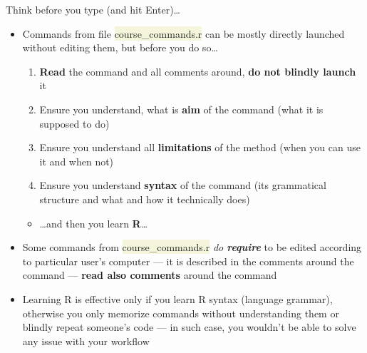 \documentclass[compress, ucs, xelatex, 11pt, xcolor=svgnames, aspectratio=169,
	hyperref={
		bookmarks=true,
		unicode=true,
		colorlinks=true,
		pdftitle={Molecular data in R},
		plainpages=false,
		pdfauthor={Vojtech Zeisek},
		pdfsubject={Course about phylogeny and evolution in R},
		pdfcreator={XeLaTeX},
		pdfkeywords={R, evolution, phylogeny, molecular data},
		linkcolor=Crimson, %
		anchorcolor=Magenta, %
		citecolor=Magenta, %
		filecolor=Magenta, %
		menucolor=Magenta, %
		urlcolor=DodgerBlue, %
		pdftex},
	url={hyphens, lowtilde} %
	]{beamer}
\renewcommand{\texttt}[1]{\colorbox{Beige}{{\ttfamily #1}}}
\begin{document}
\begin{frame}{Think before you type (and hit Enter)\ldots}
	\begin{itemize}
		\item Commands from file \texttt{course\_commands.r} can be mostly directly launched without editing them, but before you do so\ldots
		\begin{enumerate}
			\item \textbf{Read} the command and all comments around, \textbf{do not blindly launch} it
			\item Ensure you understand, what is \textbf{aim} of the command (what it is supposed to do)
			\item Ensure you understand all \textbf{limitations} of the method (when you can use it and when not)
			\item Ensure you understand \textbf{syntax} of the command (its grammatical structure and what and how it technically does)
		\end{enumerate}
		\begin{itemize}
			\item \ldots and then you \alert{learn} \textbf{R}\ldots
		\end{itemize}
		\item Some \alert{commands} from \texttt{course\_commands.r} \alert{\textit{do \textbf{require}} to be edited} according to particular user's computer --- it is described in the comments around the command --- \textbf{read also comments} around the command
		\item Learning R is effective only if you learn R syntax (language grammar), otherwise you only memorize commands without understanding them or blindly repeat someone's code --- in such case, you wouldn't be able to solve any issue with your workflow
	\end{itemize}
\end{frame}
\end{document}

